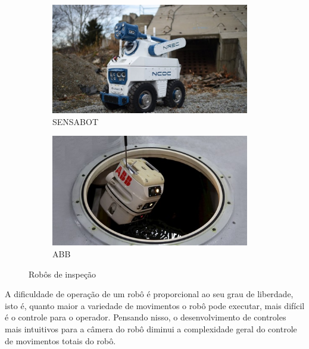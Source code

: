 \begin{figure}[H]
	\centering
	\begin{subfigure}{.5\textwidth}
		\includegraphics[width=0.95\textwidth]{figuras/sensabot.jpg}
		\caption{SENSABOT}
		\label{fig:sensabot}
	\end{subfigure}%
	\begin{subfigure}{.5\textwidth}
		\includegraphics[width=0.95\textwidth]{figuras/abb.jpg}
		\caption{ABB}
		\label{fig:abb}
	\end{subfigure}
	\caption{Robôs de inspeção}
\end{figure}

A dificuldade de operação de um robô é proporcional ao seu grau de liberdade, isto é, quanto maior a variedade de movimentos o robô pode executar, mais difícil é o controle para o operador.
Pensando nisso, o desenvolvimento de controles mais intuitivos para a câmera do robô diminui a complexidade geral do controle de movimentos totais do robô.


